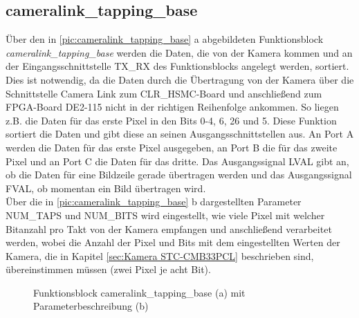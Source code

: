 \documentclass[ngerman,12pt]{article} %
\begin{document}
{\subsection{cameralink\_tapping\_base}
\label{sec:cameralink_tapping_base}
Über den in \autoref{pic:cameralink_tapping_base} a abgebildeten Funktionsblock \textit{cameralink\_tapping\_base} werden die Daten, die von der Kamera kommen und an der Eingangsschnittstelle TX\_RX des Funktionsblocks angelegt werden, sortiert. Dies ist notwendig, da die Daten durch die Übertragung von der Kamera über die Schnittstelle Camera Link zum CLR\_HSMC-Board und anschließend zum FPGA-Board DE2-115 nicht in der richtigen Reihenfolge ankommen. So liegen z.B. die Daten für das erste Pixel in den Bits 0-4, 6, 26 und 5. Diese Funktion sortiert die Daten und gibt diese an seinen Ausgangsschnittstellen aus. An Port A werden die Daten für das erste Pixel ausgegeben, an Port B die für das zweite Pixel und an Port C die Daten für das dritte. Das Ausgangssignal LVAL gibt an, ob die Daten für eine Bildzeile gerade übertragen werden und das Ausgangssignal FVAL, ob momentan ein Bild übertragen wird.\\
Über die in \autoref{pic:cameralink_tapping_base} b dargestellten Parameter NUM\_TAPS und NUM\_BITS wird eingestellt, wie viele Pixel mit welcher Bitanzahl pro Takt von der Kamera empfangen und anschließend verarbeitet werden, wobei die Anzahl der Pixel und Bits mit dem eingestellten Werten der Kamera, die in Kapitel \ref{sec:Kamera STC-CMB33PCL}  beschrieben sind, übereinstimmen müssen (zwei Pixel je acht Bit).\newline 

\begin{figure}[h!tb]
  \centering
  \qquad
  \caption[Funktionsblock cameralink\_tapping\_base mit Parameterbeschreibung]{\label{pic:cameralink_tapping_base}Funktionsblock cameralink\_tapping\_base (a) mit Parameterbeschreibung (b)}
\end{figure}



}
\end{document}
